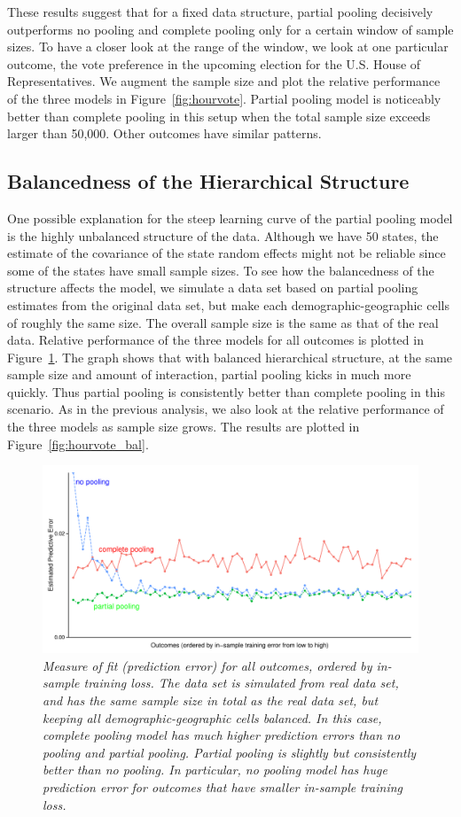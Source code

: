 \documentclass[sii]{ipart}
\begin{document}
These results suggest that for a fixed data structure, partial pooling decisively
outperforms no pooling and complete pooling only for a certain window of sample
sizes. To have a closer look at the range of the window, we look at one
particular outcome, the vote preference in the upcoming election for the
U.S. House of Representatives. We augment the sample size and plot the relative
performance of the three models in Figure~\ref{fig:hourvote}. Partial pooling
model is noticeably better than complete pooling in this setup when the total
sample size exceeds larger than 50,000. Other outcomes have similar patterns.


\subsection{Balancedness of the Hierarchical Structure}


One possible explanation for the steep learning curve of the partial pooling
model is the highly unbalanced structure of the data. Although we have 50 states,
the estimate of the covariance of the state random effects might not be reliable
since some of the states have small sample sizes. To see how the balancedness of
the structure affects the model, we simulate a data set based on partial pooling
estimates from the original data set, but make each demographic-geographic cells
of roughly the same size. The overall sample size is the same as that of the real
data. Relative performance of the three models for all outcomes is plotted in
Figure~\ref{fig:figbal}. The graph shows that with balanced hierarchical
structure, at the same sample size and amount of interaction, partial pooling
kicks in much more quickly. Thus partial pooling is consistently better than
complete pooling in this scenario. As in the previous analysis, we also look at
the relative performance of the three models as sample size grows. The results
are plotted in Figure~\ref{fig:hourvote_bal}.

\begin{figure}[h]
  \centering
  \includegraphics[width=.45\textwidth]{alloutcomesxbal.pdf}
  \caption{\em Measure of fit (prediction error) for all outcomes, ordered by
    in-sample training loss. The data set is simulated from real data set, and
    has the same sample size in total as the real data set, but keeping all
    demographic-geographic cells balanced. In this case, complete pooling model
    has much higher prediction errors than no pooling and partial
    pooling. Partial pooling is slightly but consistently better than no
    pooling. In particular, no pooling model has huge prediction error for
    outcomes that have smaller in-sample training loss.}
  \label{fig:figbal}
\end{figure}
\end{document}
